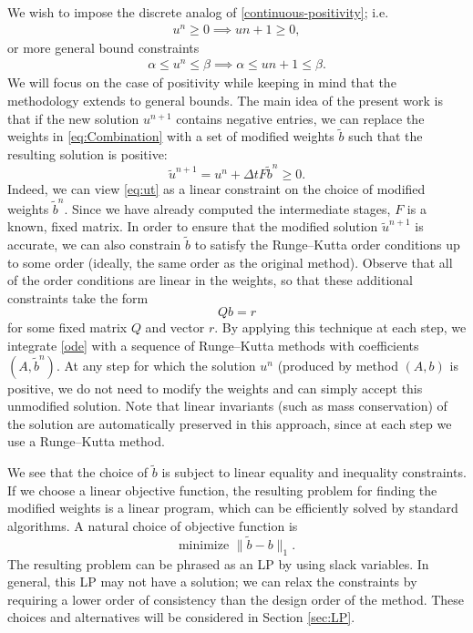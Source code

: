 \documentclass[a4paper]{article}
\numberwithin{equation}{section}
\theoremstyle{plain}
\theoremstyle{definition}
\numberwithin{theorem}{section}
\newcommand{\dt}{{\Delta t}}
\newcommand{\1}{\mathbbm{1}}
\newcommand{\ut}{\tilde{u}}
\newcommand{\bt}{\tilde{b}}
\begin{document}
We wish to impose the discrete analog of \eqref{continuous-positivity}; i.e.
\begin{align} \label{positivity}
    u^n\ge 0 \implies u{n+1} \ge 0,
\end{align}
or more general bound constraints
\begin{align}
    \alpha \le u^n\le \beta \implies \alpha \le u{n+1} \le \beta.
\end{align}
We will focus on the case of positivity while keeping in mind that
the methodology extends to general bounds.
The main idea of the present work is that if the new solution $u^{n+1}$ contains
negative entries, we can replace the weights in \eqref{eq:Combination} with
a set of modified weights $\bt$ such that the resulting solution is positive:
\begin{equation}\label{eq:ut}
\ut^{n+1} = u^n + \dt F \bt^n \ge 0.
\end{equation}
Indeed, we can view \eqref{eq:ut} as a linear constraint on the choice of
modified weights $\bt^n$.  Since we have already computed the intermediate stages,
$F$ is a known, fixed matrix.  In order to ensure that the modified solution $\ut^{n+1}$
is accurate, we can also constrain $\bt$ to satisfy the Runge--Kutta order conditions
up to some order (ideally, the same order as the original method).  Observe that
all of the order conditions are linear in the weights, so that these additional constraints
take the form
$$
Qb = r
$$
for some fixed matrix $Q$ and vector $r$.
By applying this technique at each step, we integrate \eqref{ode} with a
sequence of Runge--Kutta methods with coefficients $(A,\bt^n)$.  At any step
for which the solution $u^n$ (produced by method $(A,b)$ is positive, we do not
need to modify the weights and can simply accept this unmodified solution.
Note that linear invariants (such as mass conservation) of the solution are
automatically preserved in this approach, since at each step we use a Runge--Kutta
method.

We see that the choice of $\bt$ is subject to linear equality and inequality
constraints.  If we choose a linear objective function, the resulting problem
for finding the modified weights is a linear program, which can be efficiently
solved by standard algorithms.  A natural choice of objective function is
$$
\text{minimize } \|\bt - b\|_1.
$$
The resulting problem can be phrased as an LP by using slack variables.
In general, this LP may not have a solution; we can relax the constraints
by requiring a lower order of consistency than the design order of the
method.  These choices and alternatives will be considered in Section \ref{sec:LP}.
\end{document}
